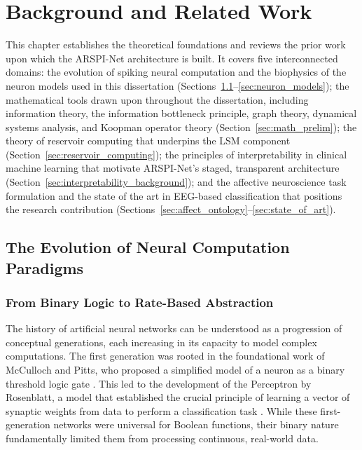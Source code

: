 \chapter{Background and Related Work}
\label{chap:background}

This chapter establishes the theoretical foundations and reviews the prior work upon which the ARSPI-Net architecture is built. It covers five interconnected domains: the evolution of spiking neural computation and the biophysics of the neuron models used in this dissertation (Sections~\ref{sec:neural_paradigms}--\ref{sec:neuron_models}); the mathematical tools drawn upon throughout the dissertation, including information theory, the information bottleneck principle, graph theory, dynamical systems analysis, and Koopman operator theory (Section~\ref{sec:math_prelim}); the theory of reservoir computing that underpins the LSM component (Section~\ref{sec:reservoir_computing}); the principles of interpretability in clinical machine learning that motivate ARSPI-Net's staged, transparent architecture (Section~\ref{sec:interpretability_background}); and the affective neuroscience task formulation and the state of the art in EEG-based classification that positions the research contribution (Sections~\ref{sec:affect_ontology}--\ref{sec:state_of_art}).

\section{The Evolution of Neural Computation Paradigms}
\label{sec:neural_paradigms}

\subsection{From Binary Logic to Rate-Based Abstraction}
The history of artificial neural networks can be understood as a progression of conceptual generations, each increasing in its capacity to model complex computations. The first generation was rooted in the foundational work of McCulloch and Pitts, who proposed a simplified model of a neuron as a binary threshold logic gate \cite{mcculloch_logical_1943}. This led to the development of the Perceptron by Rosenblatt, a model that established the crucial principle of learning a vector of synaptic weights from data to perform a classification task \cite{rosenblatt_perceptron_1958}. While these first-generation networks were universal for Boolean functions, their binary nature fundamentally limited them from processing continuous, real-world data.

